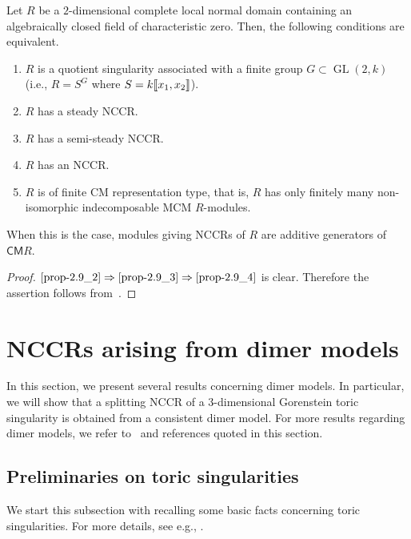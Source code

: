 \documentclass[ALCO,ThmDefs,Unicode]{cedram}
\DeclareMathOperator{\GL}{GL}
\newcommand{\CM}{\mathsf{CM}}
\newcommand{\llbracket}{\mathopen{[\mkern -2.7mu[}}
\newcommand{\rrbracket}{\mathclose{]\mkern -2.7mu]}}
\begin{document}
\begin{prop}\label{twodim}
Let $R$ be a $2$-dimensional complete local normal domain containing an algebraically closed field of characteristic zero. Then, the following conditions are equivalent.
\begin{enumerate}%
\item\label{prop-2.9_1} $R$ is a quotient singularity associated with a finite group $G\subset\GL(2, k)$ (i.e., $R=S^G$ where $S=k\llbracket x_1, x_2\rrbracket $).
\item\label{prop-2.9_2} $R$ has a steady NCCR.
\item\label{prop-2.9_3} $R$ has a semi-steady NCCR.
\item\label{prop-2.9_4} $R$ has an NCCR.
\item\label{prop-2.9_5} $R$ is of finite CM representation type, that is, $R$ has only finitely many non-isomorphic indecomposable MCM $R$-modules.
\end{enumerate}
When this is the case, modules giving NCCRs of $R$ are additive generators of $\CM R$.
\end{prop}

\begin{proof}
$\eqref{prop-2.9_2}\Rightarrow\eqref{prop-2.9_3}\Rightarrow\eqref{prop-2.9_4}$ is clear. Therefore the assertion follows from~\cite[Proposition~4.2]{IN}.
\end{proof}


\section{NCCRs arising from dimer models}\label{NCCR_via_dimer}

In this section, we present several results concerning dimer models. In particular, we will show that a splitting NCCR of a $3$-dimensional Gorenstein toric singularity is obtained from a consistent dimer model. For more results regarding dimer models, we refer to~\cite{Boc4} and references quoted in this section.

\subsection{Preliminaries on toric singularities}\label{toric_pre}
We start this subsection with recalling some basic facts concerning toric singularities. For more details, see e.g., \cite{BG2,CLS}.
\end{document}
